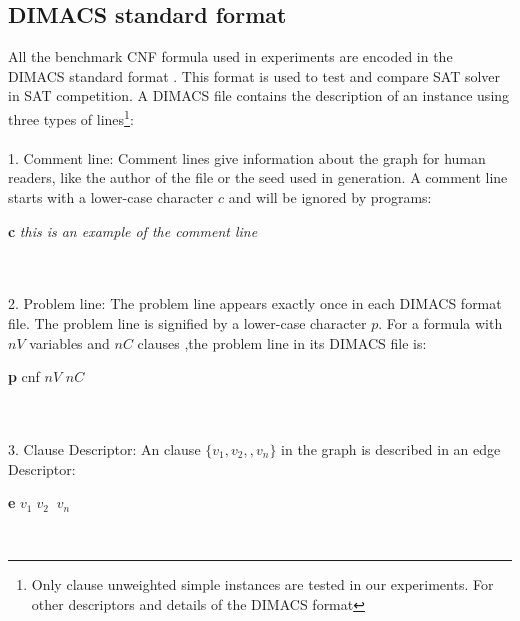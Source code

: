 \documentclass[12pt,a4paper,twoside]{scrartcl}
\numberwithin{equation}{section}
\begin{document}
\subsection{DIMACS standard format}  
All the benchmark CNF formula used in experiments are encoded in the DIMACS standard format \cite{johnson1996cliques}. This format is used to test and compare SAT solver in SAT competition. A DIMACS file contains the description of an instance using three types of lines\footnote {Only clause unweighted simple instances are tested in our experiments. For other descriptors and details of the DIMACS format}:\\ \\ 1. Comment line: Comment lines give information about the graph for human readers, like the author of the file or the seed used in generation. A comment line starts with a lower-case character $c$ and will be ignored by programs:\\ \centerline{\textbf{c} \emph{ this is an example of the comment line }}\\ \\ 2. Problem line: The problem line appears exactly once in each DIMACS format file. The problem line is signified by a lower-case character $p$.  For a formula with $nV$ variables and $nC$ clauses ,the problem line in its DIMACS file is:\\ \centerline{\textbf{p} cnf $nV$ $nC$}\\ \\ 3. Clause Descriptor: An clause $\{v_1, v_2,, v_n\}$ in the graph is described in an edge Descriptor:\\ \centerline{\textbf{e} $v_1\; v_2\;  \;v_n$}\\  
\end{document}
